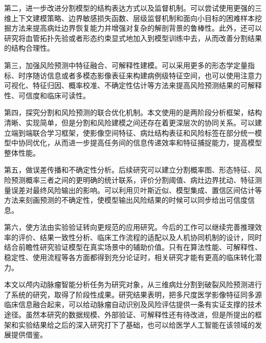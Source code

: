 第二，进一步改进分割模型的结构表达方式以及监督机制。可以尝试使用更强的三维上下文建模策略、边界敏感损失函数、层级监督机制和面向小目标的困难样本挖掘方法来提高病灶边界恢复能力并增强对复杂的解剖背景的鲁棒性。此外，还可以研究将血管拓扑先验或者形态约束显式地加入到模型训练中去，从而改善分割结果的结构合理性。

第三，加强风险预测中特征融合、可解释性建模。可以采用更多的形态学定量指标、时序随访信息或者多模态影像表征来构建病例级特征空间，也可以使用注意力可视化、特征归因、概率校准、不确定性估计等方法来提高风险预测结果的可解释性、可信度和临床可读性。

第四，探究分割和风险预测的联合优化机制。本文使用的是两阶段分析框架，结构清晰、实现简单，但是分割和风险建模之间还存在着更深层次的协同关系。可以建立端到端联合学习框架，使影像空间特征、病灶结构表征和风险标签在部分统一模型中协同优化，从而进一步提高任务间的信息传递效率和特征捕捉能力，提高模型整体性能。

第五，做误差传播和不确定性分析。后续研究可以建立分割概率图、形态特征、风险预测概率三者之间的更明确的统计联系，评价分割阈值、病灶边界扰动、特征测量误差对最终风险输出的影响。可以利用贝叶斯近似、模型集成、置信区间估计等方法来刻画预测的不确定性，使模型输出风险结果的时候可以同步给出可信度信息。

第六，使方法由实验验证转向更规范的应用研究。今后的工作可以继续完善推理效率的评价、结果一致性分析、临床工作流程的适配以及人机协同机制的设计，同时结合前瞻性研究验证模型在真实场景中的辅助价值。只有在算法性能、可解释性、稳定性、使用流程等各方面都得到充分论证时，相关研究才能有更高的临床转化潜力。



本文以颅内动脉瘤智能分析任务为研究对象，从三维病灶分割到破裂风险预测进行了系统的研究，取得了阶段性成果。研究结果表明，把多尺度医学影像特征同多源临床信息融合起来，可以给动脉瘤自动识别及风险评估提供一条有实证支撑的技术途径。虽然本研究的数据规模、外部验证、可解释性还有待改进，但是所提出的框架和实验结果给之后的深入研究打下了基础，也可以给医学人工智能在该领域的发展提供借鉴。